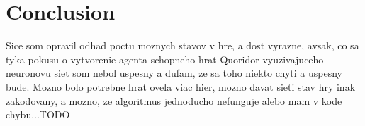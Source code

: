 \chapter{Conclusion}\label{chap:6}

Sice som opravil odhad poctu moznych stavov v hre, a dost vyrazne, avsak, co sa
tyka pokusu o vytvorenie agenta schopneho hrat Quoridor vyuzivajuceho neuronovu
siet som nebol uspesny a dufam, ze sa toho niekto chyti a uspesny bude. Mozno
bolo potrebne hrat ovela viac hier, mozno davat sieti stav hry inak zakodovany,
a mozno, ze algoritmus jednoducho nefunguje alebo mam v kode chybu...TODO
